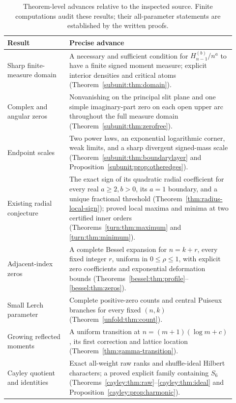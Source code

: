 \begin{table}[htbp]
\centering\small
\begin{tabular}{@{}p{0.25\linewidth}p{0.67\linewidth}@{}}
\toprule
Result & Precise advance\\
\midrule
Sharp finite-measure domain & A necessary and sufficient condition for
$H_{n-1}^{(b)}/n^a$ to have a finite signed moment measure; explicit
interior densities and critical atoms
(Theorem~\ref{subunit:thm:domain}).\\[5pt]
Complex and angular zeros & Nonvanishing on the principal slit plane and
one simple imaginary-part zero on each open upper arc throughout the
full measure domain (Theorem~\ref{subunit:thm:zerofree}).\\[5pt]
Endpoint scales & Two power laws, an exponential logarithmic corner,
weak limits, and a sharp divergent signed-mass scale
(Theorem~\ref{subunit:thm:boundarylayer} and
Proposition~\ref{subunit:prop:otheredges}).\\[5pt]
Existing radial conjecture & The exact sign of its quadratic radial
coefficient for every real $a\ge2,b>0$, its $a=1$ boundary, and a
unique fractional threshold (Theorem~\ref{thm:radius-local-sign});
proved local maxima and minima at two certified inner orders
(Theorems~\ref{turn:thm:maximum} and \ref{turn:thm:minimum}).\\[5pt]
Adjacent-index zeros & A complete Bessel expansion for $n=k+r$, every
fixed integer $r$, uniform in $0\le\rho\le1$, with explicit zero
coefficients and exponential deformation bounds
(Theorems~\ref{bessel:thm:profile}--\ref{bessel:thm:zeros}).\\[5pt]
Small Lerch parameter & Complete positive-zero counts and central
Puiseux branches for every fixed $(n,k)$
(Theorem~\ref{unfold:thm:count}).\\[5pt]
Growing reflected moments & A uniform transition at
$n=(m+1)(\log m+c)$, its first correction and lattice location
(Theorem~\ref{thm:gamma-transition}).\\[5pt]
Cayley quotient and identities & Exact all-weight raw ranks and
shuffle-ideal Hilbert characters; a proved explicit family containing
$S_6$ (Theorems~\ref{cayley:thm:raw}--\ref{cayley:thm:ideal} and
Proposition~\ref{cayley:prop:harmonic}).\\
\bottomrule
\end{tabular}
\caption{Theorem-level advances relative to the inspected source.
Finite computations audit these results; their all-parameter statements
are established by the written proofs.}
\label{tab:results}
\end{table}

